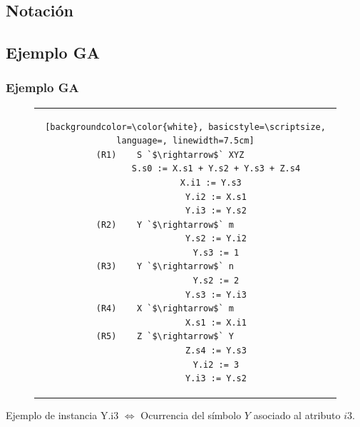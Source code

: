 \documentclass[10pt, xcolor=table, xcolor=dvipsnames]{beamer}
\begin{document}

\subsection*{Notación}


\subsection*{Ejemplo GA}

\begin{frame}[fragile]
    \frametitle{Ejemplo GA}

\begin{figure}[h]
\begin{center}
\begin{tabular}{c}
\begin{lstlisting}[backgroundcolor=\color{white}, basicstyle=\scriptsize, language=, linewidth=7.5cm]
(R1)    S `$\rightarrow$` XYZ      
            S.s0 := X.s1 + Y.s2 + Y.s3 + Z.s4
            X.i1 := Y.s3  
            Y.i2 := X.s1
            Y.i3 := Y.s2
(R2)    Y `$\rightarrow$` m        
            Y.s2 := Y.i2
            Y.s3 := 1
(R3)    Y `$\rightarrow$` n        
            Y.s2 := 2
            Y.s3 := Y.i3
(R4)    X `$\rightarrow$` m        
            X.s1 := X.i1
(R5)    Z `$\rightarrow$` Y        
            Z.s4 := Y.s3
            Y.i2 := 3
            Y.i3 := Y.s2
\end{lstlisting} 
\end{tabular}
\end{center}
\end{figure}

    \vspace{-0.5cm}
    \begin{block}{Ejemplo de instancia}
        Y.i3 $\Leftrightarrow$ Ocurrencia del símbolo $Y$ asociado al atributo $i3$.
    \end{block}
\end{frame}
\end{document}
